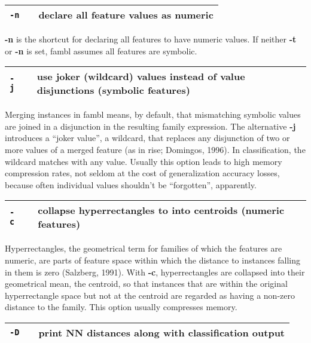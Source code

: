 \documentclass[11pt]{article}
\begin{document}
\begin{tabular}{|p{}|p{}|p{}|}
\hline
{\tt -n} & & declare all feature values as numeric \\
\hline
\end{tabular}

{\bf -n} is the shortcut for declaring all features to have numeric
values. If neither {\bf -t} or {\bf -n} is set, {\sc fambl} assumes
all features are symbolic. 
\ \\

\begin{tabular}{|p{}|p{}|p{}|}
\hline
{\tt -j} & & use joker (wildcard) values instead of value disjunctions 
(symbolic features) \\
\hline
\end{tabular}

Merging instances in {\sc fambl} means, by default, that mismatching
symbolic values are joined in a disjunction in the resulting family
expression. The alternative {\bf -j} introduces a ``joker value'', a
wildcard, that replaces any disjunction of two or more values of a
merged feature (as in {\sc rise}; Domingos, 1996). In classification,
the wildcard matches with any value. Usually this option leads to high
memory compression rates, not seldom at the cost of generalization
accuracy losses, because often individual values shouldn't be
``forgotten'', apparently. 
\ \\

\begin{tabular}{|p{}|p{}|p{}|}
\hline
{\tt -c} & & collapse hyperrectangles to into centroids (numeric features) \\
\hline
\end{tabular}

Hyperrectangles, the geometrical term for families of which the
features are numeric, are parts of feature space within which the
distance to instances falling in them is zero (Salzberg, 1991). With
{\bf -c}, hyperrectangles are collapsed into their geometrical mean,
the centroid, so that instances that are within the original
hyperrectangle space but not at the centroid are regarded as having a
non-zero distance to the family. This option usually compresses
memory. 
\ \\

\begin{tabular}{|p{}|p{}|p{}|}
\hline
{\tt -D} & & print NN distances along with classification output \\
\hline
\end{tabular}
\end{document}
